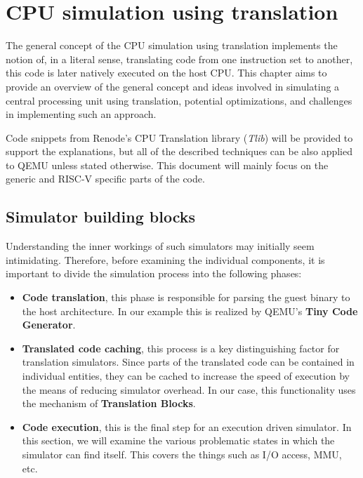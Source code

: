 
\chapter{CPU simulation using translation}

The general concept of the CPU simulation using translation implements the notion of, in a literal sense, translating
code from one instruction set to another, this code is later natively executed on the host CPU. This chapter aims to
provide an overview of the general concept and ideas involved in simulating a central processing unit using translation,
potential optimizations, and challenges in implementing such an approach.

Code snippets from Renode's CPU Translation library (\textit{Tlib})  will be provided to support the explanations, but
all of the described techniques can be also applied to QEMU unless stated otherwise. This document will mainly focus on
the generic and RISC-V specific parts of the code.

\section*{Simulator building blocks}

Understanding the inner workings of such simulators may initially seem intimidating. Therefore, before examining the
individual components, it is important to divide the simulation process into the following phases:

\begin{itemize}
    \item{\textbf{Code translation}, this phase is responsible for parsing the guest binary to the host architecture.
    In our example this is realized by QEMU's \textbf{Tiny Code Generator}.}
    \item{\textbf{Translated code caching}, this process is a key distinguishing factor for translation simulators.
    Since parts of the translated code can be contained in individual entities, they can be cached to increase the speed
    of execution by the means of reducing simulator overhead. In our case, this functionality uses the mechanism of
    \textbf{Translation Blocks}.}
    \item{\textbf{Code execution}, this is the final step for an execution driven simulator. In this section, we will
    examine the various problematic states in which the simulator can find itself. This covers the things such as
    I/O access, MMU, etc.}
\end{itemize}

